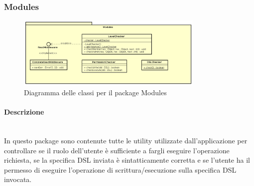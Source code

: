 \subsubsection{Modules}
\begin{figure}[h]
\centering
\includegraphics[width=0.8\textwidth]{res/sections/backend/Modules.png}
\caption{Diagramma delle classi per il package Modules}
\end{figure}
\paragraph{Descrizione} \mbox{}\\
In questo package sono contenute tutte le utility utilizzate dall'applicazione per controllare se il ruolo dell'utente è sufficiente a fargli eseguire l'operazione richiesta, se la specifica DSL inviata è sintatticamente corretta e se l'utente ha il permesso di eseguire l'operazione di scrittura/esecuzione sulla specifica DSL invocata.
